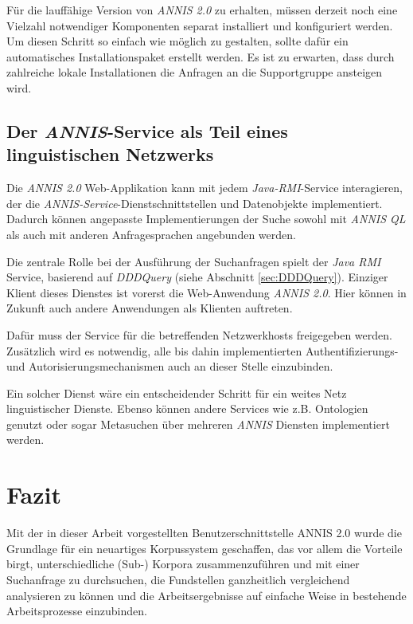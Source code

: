 Für die lauffähige Version von \emph{ANNIS 2.0} zu erhalten, müssen derzeit noch eine Vielzahl notwendiger Komponenten separat installiert und konfiguriert werden. Um diesen Schritt so einfach wie möglich zu gestalten, sollte dafür ein automatisches Installationspaket erstellt werden. Es ist zu erwarten, dass durch zahlreiche lokale Installationen die Anfragen an die Supportgruppe ansteigen wird.

\subsection{Der \emph{ANNIS}-Service als Teil eines linguistischen Netzwerks}

Die \emph{ANNIS 2.0} Web-Applikation kann mit jedem \emph{Java-RMI}-Service interagieren, der die \emph{ANNIS-Service}-Dienstschnittstellen und Datenobjekte implementiert. Dadurch können angepasste Implementierungen der Suche sowohl mit \emph{ANNIS QL} als auch mit anderen Anfragesprachen angebunden werden.

Die zentrale Rolle bei der Ausführung der Suchanfragen spielt der \emph{Java RMI} Service, basierend auf \emph{DDDQuery} (siehe Abschnitt \ref{sec:DDDQuery}). Einziger Klient dieses Dienstes ist vorerst die Web-Anwendung \emph{ANNIS 2.0}. Hier können in Zukunft auch andere Anwendungen als Klienten auftreten.

Dafür muss der Service für die betreffenden Netzwerkhosts freigegeben werden. Zusätzlich wird es notwendig, alle bis dahin implementierten Authentifizierungs- und Autorisierungsmechanismen auch an dieser Stelle einzubinden.

Ein solcher Dienst wäre ein entscheidender Schritt für ein weites Netz linguistischer Dienste. Ebenso können andere Services wie z.B. Ontologien \citep[vgl.][]{chiarcosXXXXonthology} genutzt oder sogar Metasuchen über mehreren \emph{ANNIS} Diensten implementiert werden. 

\section{Fazit}

Mit der in dieser Arbeit vorgestellten Benutzerschnittstelle ANNIS 2.0 wurde die Grundlage für ein neuartiges Korpussystem geschaffen, das vor allem die Vorteile birgt, unterschiedliche (Sub-) Korpora zusammenzuführen und mit einer Suchanfrage zu durchsuchen, die Fundstellen ganzheitlich vergleichend analysieren zu können und die Arbeitsergebnisse auf einfache Weise in bestehende Arbeitsprozesse einzubinden.

